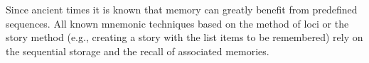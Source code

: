 

  Since ancient times it is known that memory can greatly benefit from
  predefined sequences. All known mnemonic techniques based on the method of
  loci or the story method (e.g., creating a story with the list items to be
  remembered) rely on the sequential storage and the recall of associated
  memories.

